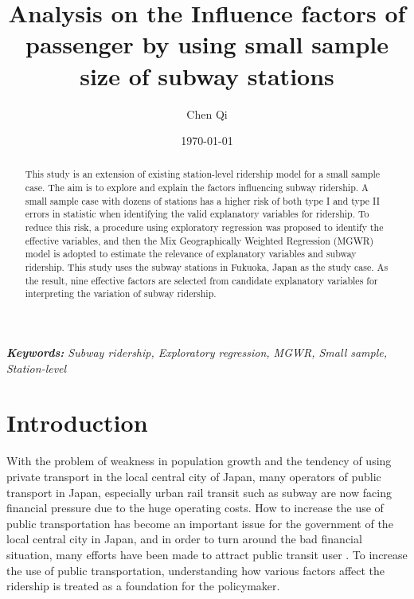 \documentclass[utf8]{article}
\begin{document}
\title{Analysis on the Influence factors of passenger by using small sample size of subway stations}
\author{Chen Qi}
\date{\today}
\maketitle

%
\begin{abstract}
This study is an extension of existing station-level ridership model for a small sample case. The aim is to explore and explain the factors influencing subway ridership. A small sample case with dozens of stations has a higher risk of both type I and type II errors in statistic when identifying the valid explanatory variables for ridership. To reduce this risk, a procedure using exploratory regression was proposed to identify the effective variables, and then the Mix Geographically Weighted Regression (MGWR) model is adopted to estimate the relevance of explanatory variables and subway ridership. This study uses the subway stations in Fukuoka, Japan as the study case. As the result, nine effective factors are selected from candidate explanatory variables for interpreting the variation of subway ridership.
\end{abstract}

%
\begin{center}
{\slshape \textbf{Keywords:} Subway ridership, Exploratory regression, MGWR, Small sample, Station-level}
\end{center}
	
%
\section{Introduction}
\indent %

With the problem of weakness in population growth and the tendency of using private transport in the local central city of Japan, many operators of public transport in Japan, especially urban rail transit such as subway are now facing financial pressure due to the huge operating costs. How to increase the use of public transportation has become an important issue for the government of the local central city in Japan, and in order to turn around the bad financial situation, many efforts have been made to attract public transit user  \cite{TakashiNakamura2015}. To increase the use of public transportation, understanding how various factors affect the ridership is treated as a foundation for the policymaker.
\end{document}
